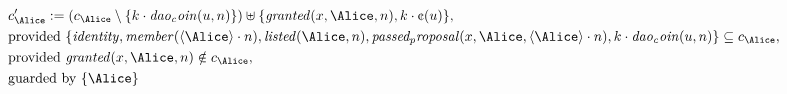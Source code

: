 \begin{align*}
&
c'_
{
\Alice
}
 := 
(c_
{
\Alice
}
 \setminus 
\{
k
\cdot
\mathit{
dao_coin
}
(
u
,
n
)
\}
) \uplus 
\{
\mathit{
granted
}
(
x
,
\Alice
,
n
)
,
k
\cdot
\text{\textcent}
(
u
)
\}
,\\
&
\text{provided } 
\{
\mathit{
identity
}
,
\mathit{
member
}
(
\langle
\Alice
\rangle
\cdot
n
)
,
\mathit{
listed
}
(
\Alice
,
n
)
,
\mathit{
passed_proposal
}
(
x
,
\Alice
,
\langle
\Alice
\rangle
\cdot
n
)
,
k
\cdot
\mathit{
dao_coin
}
(
u
,
n
)
\}
 \subseteq c_
{
\Alice
}
,\\
&
\text{provided } 
\mathit{
granted
}
(
x
,
\Alice
,
n
)
 \notin c_
{
\Alice
}
,\\
&
\text{guarded by } \{
\Alice
\}
\end{align*}
